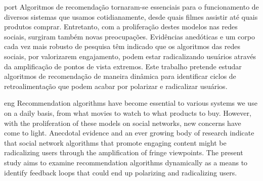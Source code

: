 
\begin{resumo}{port}
Algoritmos de recomendação tornaram-se essenciais para o funcionamento de
diversos sistemas que usamos cotidianamente, desde quais filmes assistir até
quais produtos comprar. Entretanto, com a proliferação destes modelos nas redes
sociais, surgiram também novas preocupações. Evidências anedóticas e um corpo
cada vez mais robusto de pesquisa têm indicado que os algoritmos das redes
sociais, por valorizarem engajamento, podem estar radicalizando usuários através
da amplificação de pontos de vista extremos. Este trabalho pretende estudar
algoritmos de recomendação de maneira dinâmica para identificar ciclos de
retroalimentação que podem acabar por polarizar e radicalizar usuários.
\end{resumo}

\begin{resumo}{eng}
Recommendation algorithms have become essential to various systems we use on a
daily basis, from what movies to watch to what products to buy. However, with
the proliferation of these models on social networks, new concerns have come to
light. Anecdotal evidence and an ever growing body of research indicate that
social network algorithms that promote engaging content might be radicalizing
users through the amplification of fringe viewpoints. The present study aims to
examine recommendation algorithms dynamically as a means to identify feedback
loops that could end up polarizing and radicalizing users.
\end{resumo}

